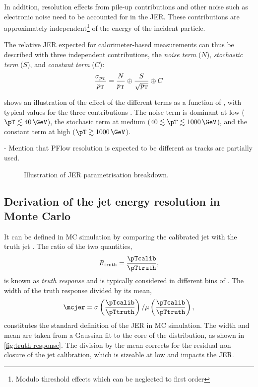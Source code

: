 In addition, resolution effects from pile-up contributions and other noise such as electronic noise need to be accounted for in the JER. These contributions are approximately independent\footnote{Modulo threshold effects which can be neglected to first order} of the energy of the incident particle.

The relative JER expected for calorimeter-based measurements can thus be described with three independent contributions, the \emph{noise term} ($N$), \emph{stochastic term} ($S$), and \emph{constant term} ($C$):
\begin{equation}
    \label{eq:jer-parametrisation}
    \frac{\sigma_{p_{\rm T}}}{p_{\rm T}} = \frac{N}{p_{\rm T}} \oplus \frac{S}{\sqrt{p_{\rm T}}} \oplus C
\end{equation}

 shows an illustration of the effect of the different terms as a function of \pT, with typical values for the three contributions . The noise term is dominant at low \pT ($\pT \lesssim 40\,\GeV$), the stochasic term at medium \pT ($40 \lesssim \pT \lesssim 1000\,\GeV$), and the constant term at high \pT ($\pT \gtrsim 1000\,\GeV$).

- Mention that PFlow resolution is expected to be different as tracks are partially used.

\FloatBarrier
\begin{figure}
    \caption{Illustration of JER parametrisation breakdown.}
    \label{fig:jer-parametrisation}
\end{figure}



\subsection{Derivation of the jet energy resolution in Monte Carlo}
It can be defined in MC simulation by comparing the calibrated jet \pT with the truth jet \pT. The ratio of the two quantities,
\begin{equation}
    R_{\text{truth}} =  \frac{\pTcalib}{\pTtruth},
\end{equation}
is known as \emph{truth response} and is typically considered in different bins of \pTtruth.
The width of the truth response divided by its mean,
\begin{equation}
    \mcjer = \sigma \left( \frac{\pTcalib}{\pTtruth} \right) / \mu \left( \frac{\pTcalib}{\pTtruth} \right),
\end{equation}
constitutes the standard definition of the JER in MC simulation. The width and mean are taken from a Gaussian fit to the core of the distribution, as shown in \cref{fig:truth-response}. The division by the mean corrects for the residual non-closure of the jet calibration, which is sizeable at low \pT and impacts the JER.

